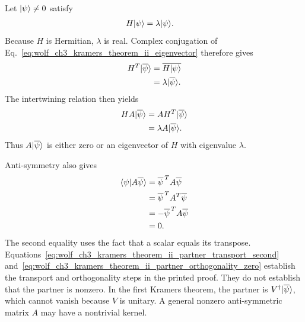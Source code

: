 \documentclass{article}
\begin{document}
Let $|\psi\rangle\neq 0$ satisfy
\begin{align}
    H|\psi\rangle&=\lambda|\psi\rangle.
    \label{eq:wolf_ch3_kramers_theorem_ii_eigenvector}
\end{align}
Because $H$ is Hermitian, $\lambda$ is real. Complex conjugation of
Eq.~\ref{eq:wolf_ch3_kramers_theorem_ii_eigenvector} therefore gives
\begin{align}
    H^T|\overline{\psi}\rangle
        &=\overline{H|\psi\rangle}
    \label{eq:wolf_ch3_kramers_theorem_ii_conjugate_eigenvector_first}\\
        &=\lambda|\overline{\psi}\rangle.
    \label{eq:wolf_ch3_kramers_theorem_ii_conjugate_eigenvector_second}
\end{align}
The intertwining relation then yields
\begin{align}
    HA|\overline{\psi}\rangle
        &=AH^T|\overline{\psi}\rangle
    \label{eq:wolf_ch3_kramers_theorem_ii_partner_transport_first}\\
        &=\lambda A|\overline{\psi}\rangle.
    \label{eq:wolf_ch3_kramers_theorem_ii_partner_transport_second}
\end{align}
Thus $A|\overline{\psi}\rangle$ is either zero or an eigenvector of $H$ with
eigenvalue $\lambda$.

Anti-symmetry also gives
\begin{align}
    \langle \psi | A\overline{\psi} \rangle
        &=\overline{\psi}^{\,T}A\overline{\psi}
    \label{eq:wolf_ch3_kramers_theorem_ii_partner_orthogonality_first}\\
        &=\overline{\psi}^{\,T}A^T\overline{\psi}
    \label{eq:wolf_ch3_kramers_theorem_ii_partner_orthogonality_second}\\
        &=-\overline{\psi}^{\,T}A\overline{\psi}
    \label{eq:wolf_ch3_kramers_theorem_ii_partner_orthogonality_third}\\
        &=0.
    \label{eq:wolf_ch3_kramers_theorem_ii_partner_orthogonality_zero}
\end{align}
The second equality uses the fact that a scalar equals its transpose.
Equations~\ref{eq:wolf_ch3_kramers_theorem_ii_partner_transport_second}
and~\ref{eq:wolf_ch3_kramers_theorem_ii_partner_orthogonality_zero} establish
the transport and orthogonality steps in the printed proof. They do not
establish that the partner is nonzero. In the first Kramers theorem, the
partner is $V^\dagger|\overline{\psi}\rangle$, which cannot vanish because $V$
is unitary. A general nonzero anti-symmetric matrix $A$ may have a nontrivial
kernel.
\end{document}
